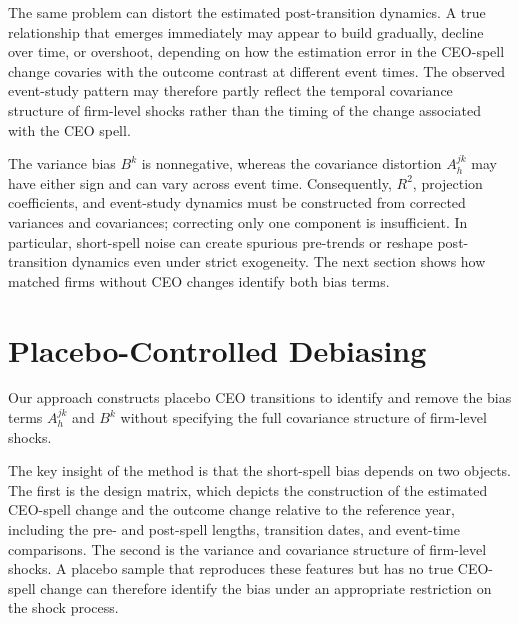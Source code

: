 \documentclass[sigconf,nonacm]{acmart}
\begin{document}
The same problem can distort the estimated post-transition dynamics.
A true relationship that emerges immediately may appear to build
gradually, decline over time, or overshoot, depending on how the
estimation error in the CEO-spell change covaries with the outcome
contrast at different event times. The observed event-study pattern
may therefore partly reflect the temporal covariance structure of
firm-level shocks rather than the timing of the change associated with
the CEO spell.

The variance bias $B^k$ is nonnegative, whereas the covariance distortion $A_h^{jk}$ may have either sign and can vary across event time. Consequently, $R^2$, projection coefficients, and event-study dynamics must be constructed from corrected variances and covariances; correcting only one component is insufficient. In particular, short-spell noise can create spurious pre-trends or reshape post-transition dynamics even under strict exogeneity. The next section shows how matched firms without CEO changes identify both bias terms.


\section{Placebo-Controlled Debiasing}\label{sec:placebo_debiasing}

Our approach constructs placebo CEO transitions to identify and remove
the bias terms $A_h^{jk}$ and $B^k$ without specifying the full
covariance structure of firm-level shocks. 

The key insight of the method is that the short-spell bias depends on two objects. The first is the design matrix, which depicts the construction of the estimated CEO-spell change and the outcome change relative to the reference year, including the pre- and post-spell lengths, transition dates, and event-time comparisons. The second is the variance and covariance structure of firm-level shocks. A placebo sample that reproduces these features but has no true CEO-spell change can therefore identify the bias under an appropriate restriction on the shock process.
\end{document}
